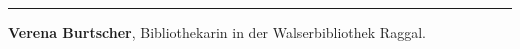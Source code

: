 \begin{center}\rule{0.5\linewidth}{\linethickness}\end{center}

\textbf{Verena Burtscher}, Bibliothekarin in der Walserbibliothek
Raggal.

